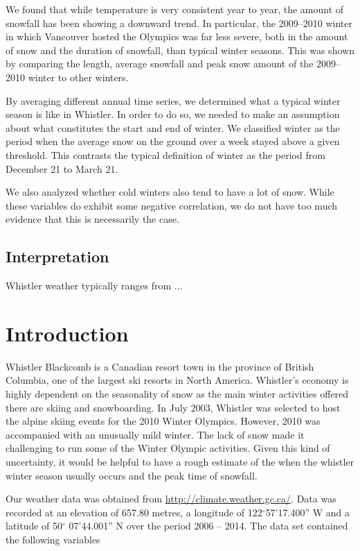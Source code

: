\documentclass[12pt,twoside]{article}
\begin{document}
{\noindent We found that while temperature is very consistent year to year, the amount of snowfall has been showing a downward trend. In particular, the 2009--2010 winter in which Vancouver hosted the Olympics was far less severe, both in the amount of snow and the duration of snowfall, than typical winter seasons. This was shown by comparing the length, average snowfall and peak snow amount of the 2009--2010 winter to other winters.

By averaging different annual time series, we determined what a typical winter season is like in Whistler. In order to do so, we needed to make an assumption about what constitutes the start and end of winter. We classified winter as the period when the average snow on the ground over a week stayed above a given threshold. This contrasts the typical definition of winter as the period from December 21 to March 21.

We also analyzed whether cold winters also tend to have a lot of snow. While these variables do exhibit some negative correlation, we do not have too much evidence that this is necessarily the case.

\subsection{Interpretation}

Whistler weather typically ranges from $\dots$

\section{Introduction}

Whistler Blackcomb is a Canadian resort town in the province of British Columbia, one of the largest ski resorts in North America. Whistler’s economy is highly dependent on the seasonality of snow as the main winter activities offered there are skiing and snowboarding. In July 2003, Whistler was selected to host the alpine skiing events for the 2010 Winter Olympics. However, 2010 was accompanied with an unusually mild winter. The lack of snow made it challenging to run some of the Winter Olympic activities. Given this kind of uncertainty, it would be helpful to have a rough estimate of the when the whistler winter season usually occurs and the peak time of snowfall.

Our weather data was obtained from \url{http://climate.weather.gc.ca/}. Data was recorded at an elevation of 657.80 metres, a longitude of 122$^{\circ}$57'17.400'' W and a latitude of 50$^{\circ}$ 07'44.001'' N over the period 2006 -- 2014. The data set contained the following variables

}
\end{document}
